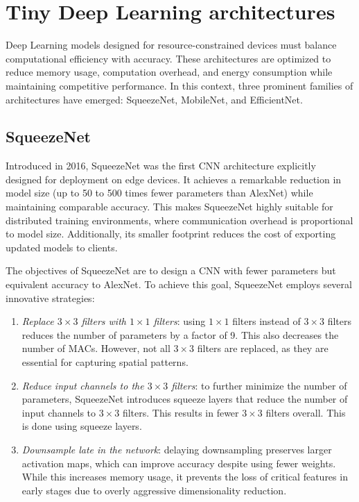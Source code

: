 \section{Tiny Deep Learning architectures}

Deep Learning models designed for resource-constrained devices must balance computational efficiency with accuracy.
These architectures are optimized to reduce memory usage, computation overhead, and energy consumption while maintaining competitive performance.
In this context, three prominent families of architectures have emerged: SqueezeNet, MobileNet, and EfficientNet.

\subsection{SqueezeNet}
Introduced in 2016, SqueezeNet was the first CNN architecture explicitly designed for deployment on edge devices.
It achieves a remarkable reduction in model size (up to 50 to 500 times fewer parameters than AlexNet) while maintaining comparable accuracy.
This makes SqueezeNet highly suitable for distributed training environments, where communication overhead is proportional to model size.
Additionally, its smaller footprint reduces the cost of exporting updated models to clients.

The objectives of SqueezeNet are to design a CNN with fewer parameters but equivalent accuracy to AlexNet.
To achieve this goal, SqueezeNet employs several innovative strategies:
\begin{enumerate}
    \item \textit{Replace $3\times 3$ filters with $1\times 1$ filters}: using $1\times 1$ filters instead of $3\times 3$ filters reduces the number of parameters by a factor of 9. 
        This also decreases the number of MACs. 
        However, not all $3\times 3$ filters are replaced, as they are essential for capturing spatial patterns.
    \item \textit{Reduce input channels to the $3\times 3$ filters}: to further minimize the number of parameters, SqueezeNet introduces squeeze layers that reduce the number of input channels to $3\times 3$ filters. 
        This results in fewer $3\times 3$ filters overall. 
        This is done using squeeze layers. 
    \item \textit{Downsample late in the network}: delaying downsampling preserves larger activation maps, which can improve accuracy despite using fewer weights.
        While this increases memory usage, it prevents the loss of critical features in early stages due to overly aggressive dimensionality reduction.
\end{enumerate}

